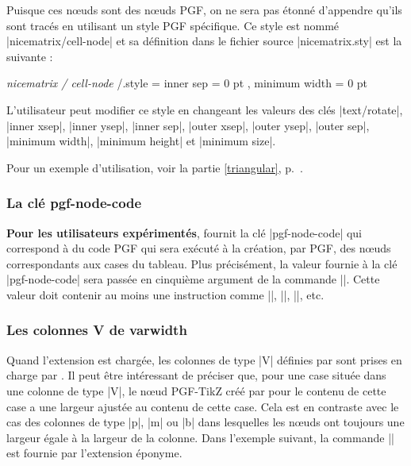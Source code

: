 \documentclass[dvipsnames]{article}%
\begin{document}
\bigskip
Puisque ces nœuds sont des nœuds PGF, on ne sera pas étonné d'appendre qu'ils
sont tracés en utilisant un style PGF spécifique. Ce style est nommé
|nicematrix/cell-node| et sa définition dans le fichier source |nicematrix.sty|
est la suivante :

\begin{Code}
\pgfset 
  { 
    \emph{nicematrix / cell-node} /.style = 
     {
       inner sep = 0 pt ,
       minimum width = 0 pt
     }
  }
\end{Code}

L'utilisateur peut modifier ce style en changeant les valeurs des clés |text/rotate|,
|inner xsep|, |inner ysep|, |inner sep|, |outer xsep|, |outer ysep|, |outer sep|,
|minimum width|, |minimum height| et |minimum size|.

\medskip
Pour un exemple d'utilisation, voir la partie \ref{triangular},
p.~\pageref{triangular}. 

\subsubsection{La clé pgf-node-code}

\textbf{Pour les utilisateurs expérimentés},  fournit la clé
|pgf-node-code| qui correspond à du code PGF qui sera exécuté à la création, par
PGF, des nœuds correspondants aux cases du tableau. Plus précisément, la valeur
fournie à la clé |pgf-node-code| sera passée en cinquième argument de la
commande |\pgfnode|. Cette valeur doit contenir au moins une instruction comme
|\pgfusepath|, |\pgfusepathqstroke|, |\pgfusepathqfill|, etc.

\subsubsection{Les colonnes V de varwidth}

\label{node-V}

Quand l'extension  est chargée, les colonnes de type |V| définies
par  sont prises en charge par . Il peut être
intéressant de préciser que, pour une case située dans une colonne de type
|V|, le nœud PGF-TikZ créé par  pour le contenu de cette case
a une largeur ajustée au contenu de cette case. Cela est en contraste avec le
cas des colonnes de type |p|, |m| ou |b| dans lesquelles les nœuds ont toujours
une largeur égale à la largeur de la colonne. Dans l'exemple suivant, la
commande |\lipsum| est fournie par l'extension éponyme.
\end{document}
